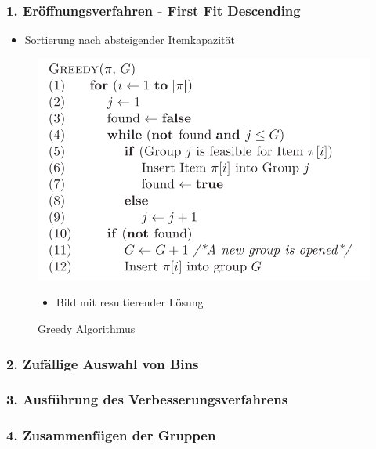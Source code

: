 \documentclass{beamer}
\begin{document}
\begin{frame}
\frametitle{1. Eröffnungsverfahren - First Fit Descending}
\begin{itemize}
\item Sortierung nach absteigender Itemkapazität
\end{itemize}
\begin{figure}[!htbp]
\begin{center}
\includegraphics[scale=0.25]{img/greedy.png}
\end{center}
\caption{Greedy Algorithmus}

\begin{footnotesize}
\begin{itemize}
\item Bild mit resultierender Lösung
\end{itemize}
\end{footnotesize}


\end{figure}

\end{frame}
\begin{frame}
\frametitle{2. Zufällige Auswahl von Bins}


\end{frame}
\begin{frame}
\frametitle{3. Ausführung des Verbesserungsverfahrens}


\end{frame}
\begin{frame}
\frametitle{4. Zusammenfügen der Gruppen}


\end{frame}
\end{document}
